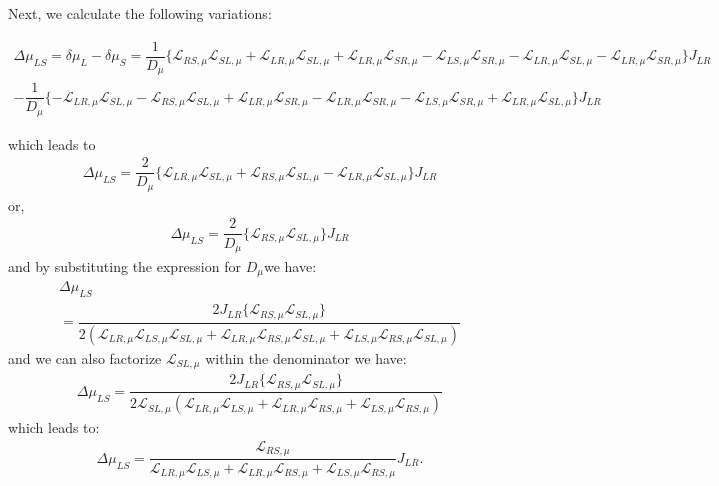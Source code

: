 Next, we calculate the following variations:
\begin{widetext}
\begin{align*}
\Delta\mu_{LS}=\delta\mu_{L}-\delta\mu_{S}
=
\dfrac{1}{D_{\mu}}\{
\mathcal{L}_{RS,\mu} \mathcal{L}_{SL,\mu}+\mathcal{L}_{LR,\mu}\mathcal{L}_{SL,\mu}+\mathcal{L}_{LR,\mu}\mathcal{L}_{SR,\mu}
-
\mathcal{L}_{LS,\mu}\mathcal{L}_{SR,\mu}-\mathcal{L}_{LR,\mu}\mathcal{L}_{SL,\mu}-\mathcal{L}_{LR,\mu}\mathcal{L}_{SR,\mu}\}J_{LR}
\\-
\dfrac{1}{D_{\mu}}\{
-\mathcal{L}_{LR,\mu}\mathcal{L}_{SL,\mu}-\mathcal{L}_{RS,\mu}\mathcal{L}_{SL,\mu} +\mathcal{L}_{LR,\mu} \mathcal{L}_{SR,\mu}
-
\mathcal{L}_{LR,\mu}\mathcal{L}_{SR,\mu}-\mathcal{L}_{LS,\mu}\mathcal{L}_{SR,\mu}+\mathcal{L}_{LR,\mu} \mathcal{L}_{SL,\mu}\}J_{LR}
\end{align*}
\end{widetext}
which leads to
\begin{align*}
\Delta\mu_{LS}
=
\dfrac{2}{D_{\mu}}\{
\mathcal{L}_{LR,\mu}\mathcal{L}_{SL,\mu}
+\mathcal{L}_{RS,\mu}\mathcal{L}_{SL,\mu}
-\mathcal{L}_{LR,\mu} \mathcal{L}_{SL,\mu}
\}J_{LR}
\end{align*}
or,
\begin{align*}
\Delta\mu_{LS}
=
\dfrac{2}{D_{\mu}}\{
\mathcal{L}_{RS,\mu}\mathcal{L}_{SL,\mu}
\}J_{LR}
\end{align*}
and by substituting the expression for $D_{\mu}$we have:
\begin{multline*}
\Delta\mu_{LS}
\\=
\dfrac{2J_{LR}\{
\mathcal{L}_{RS,\mu}\mathcal{L}_{SL,\mu}
\}}{2 (\mathcal{L}_{LR,\mu} \mathcal{L}_{LS,\mu} \mathcal{L}_{SL,\mu}+ \mathcal{L}_{LR,\mu} \mathcal{L}_{RS,\mu} \mathcal{L}_{SL,\mu}+ \mathcal{L}_{LS,\mu} \mathcal{L}_{RS,\mu} \mathcal{L}_{SL,\mu})}
\end{multline*}
and we can also factorize $\mathcal{L}_{SL,\mu}$ within the denominator we have:
\begin{align*}
\Delta\mu_{LS}
=
\dfrac{2J_{LR}\{
\mathcal{L}_{RS,\mu}\mathcal{L}_{SL,\mu}
\}}{2\mathcal{L}_{SL,\mu} (\mathcal{L}_{LR,\mu} \mathcal{L}_{LS,\mu} + \mathcal{L}_{LR,\mu} \mathcal{L}_{RS,\mu} + \mathcal{L}_{LS,\mu} \mathcal{L}_{RS,\mu})}
\end{align*}
which leads to:
\begin{align}\label{Delta:muLS}
\Delta\mu_{LS}
=
\dfrac{\mathcal{L}_{RS,\mu}}{\mathcal{L}_{LR,\mu} \mathcal{L}_{LS,\mu} + \mathcal{L}_{LR,\mu} \mathcal{L}_{RS,\mu} + \mathcal{L}_{LS,\mu} \mathcal{L}_{RS,\mu}}J_{LR}.
\end{align}
